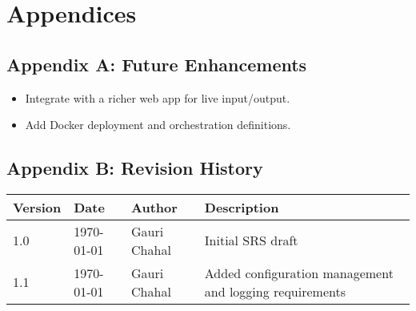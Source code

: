 \documentclass[15pt]{article}
\begin{document}
\section{Appendices}
\subsection{Appendix A: Future Enhancements}
\begin{itemize}
  \item Integrate with a richer web app for live input/output.
  \item Add Docker deployment and orchestration definitions.
\end{itemize}

\subsection{Appendix B: Revision History}
\begin{tabular}{|l|l|l|l|}
\hline
Version & Date & Author & Description \\
\hline
1.0 & \today & Gauri Chahal & Initial SRS draft \\
\hline
1.1 & \today & Gauri Chahal & Added configuration management and logging requirements \\
\hline
\end{tabular}
\end{document}
